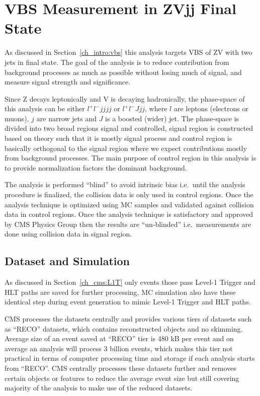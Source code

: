 \chapter{
  VBS Measurement in ZVjj Final State
 }\label{ch_vbs}

As discussed in Section~\ref{ch_intro:vbs} this analysis targets
\gls{VBS} of ZV with two jets in final state. The goal of the analysis
is to reduce contribution from background processes as much as possible
without losing much of signal, and measure signal strength and significance.

Since Z decays leptonically and V is decaying hadronically,
the phase-space of this analysis can be either
\( l^+ l^- jjjj \) or \( l^+ l^- J jj\), where \( l \) are leptons (electrons
or muons),
\( j \) are narrow jets and \( J \) is a boosted (wider) jet.
The phase-space is divided into two broad regions signal and controlled,
signal region is constructed based on theory such that it is mostly signal process
and control region is basically orthogonal to the signal region
where we expect contributions mostly from background processes.
The main purpose of control region
in this analysis is to
provide normalization factors the dominant background.

The analysis is performed ``blind'' to avoid intrinsic bias
i.e.\ until the analysis procedure is finalized, the collision data is only used
in control regions. Once the analysis technique is optimized using \gls{MC}
samples and validated against collision data in control regions. Once the
analysis technique is satisfactory and approved by \gls{CMS} Physics Group
then the results are ``un-blinded'' i.e.\ measurements are done
using collision data in signal region.

\section{
  Dataset and Simulation
 }

As discussed in Section~\ref{ch_cms:L1T} only events those pass Level-1
Trigger and \gls{HLT} paths are saved for further processing, \gls{MC}
simulation also have these identical step during event generation to mimic
Level-1 Trigger and \gls{HLT} paths.

\gls{CMS} processes the datasets centrally and provides various
tiers of datasets such as ``RECO'' datasets, which contains reconstructed
objects and no skimming. Average size of an event saved at ``RECO'' tier is
480 kB per event and on average an analysis will process
3 billion events, which makes this tier not practical in terms of computer processing
time and storage if each analysis starts from ``RECO''. \gls{CMS} centrally
processes these datasets further and removes certain objects
or features to reduce the average event size but still covering
majority of the analysis to make use of the reduced datasets.

